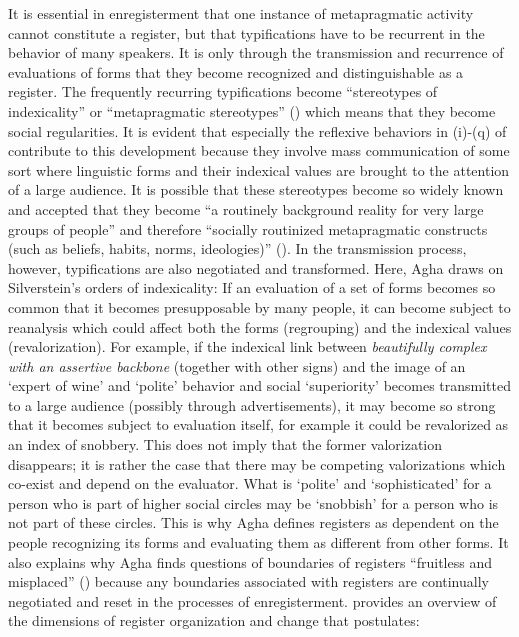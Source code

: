 It is essential in enregisterment that one instance of metapragmatic activity cannot constitute a register, but that typifications have to be recurrent in the behavior of many speakers. It is only through the transmission and recurrence of evaluations of forms that they become recognized and distinguishable as a register. The frequently recurring typifications become “stereotypes of indexicality” or “metapragmatic stereotypes” (\citeyear[151-153]{Agha2007}) which means that they become social regularities. It is evident that especially the reflexive behaviors in (i)-(q) of  contribute to this development because they involve mass communication of some sort where linguistic forms and their indexical values are brought to the attention of a large audience. It is possible that these stereotypes become so widely known and accepted that they become “a routinely background reality for very large groups of people” and therefore “socially routinized metapragmatic constructs (such as beliefs, habits, norms, ideologies)” (\citeyear[29]{Agha2007}). In the transmission process, however, typifications are also negotiated and transformed. Here, Agha draws on Silverstein’s orders of indexicality: If an evaluation of a set of forms becomes so common that it becomes presupposable by many people, it can become subject to reanalysis which could affect both the forms (regrouping) and the indexical values (revalorization). For example, if the indexical link between \emph{beautifully complex with an assertive backbone} (together with other signs) and the image of an ‘expert of wine’ and ‘polite’ behavior and social ‘superiority’ becomes transmitted to a large audience (possibly through advertisements), it may become so strong that it becomes subject to evaluation itself, for example it could be revalorized as an index of snobbery. This does not imply that the former valorization disappears; it is rather the case that there may be competing valorizations which co-exist and depend on the evaluator. What is ‘polite’ and ‘sophisticated’ for a person who is part of higher social circles may be ‘snobbish’ for a person who is not part of these circles. This is why Agha defines registers as dependent on the people recognizing its forms and evaluating them as different from other forms. It also explains why Agha finds questions of boundaries of registers “fruitless and misplaced” (\citeyear[168]{Agha2007}) because any boundaries associated with registers are continually negotiated and reset in the processes of enregisterment.  provides an overview of the dimensions of register organization and change that \citet[169]{Agha2007} postulates:


